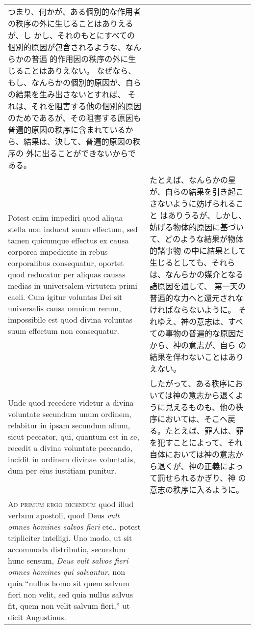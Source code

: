 \documentclass[10pt]{jsarticle} %
\begin{document}
\begin{longtable}{p{21em}p{21em}}
つまり、何かが、ある個別的な作用者の秩序の外に生じることはありえるが、し
 かし、それのもとにすべての個別的原因が包含されるような、なんらかの普遍
 的作用因の秩序の外に生じることはありえない。
なぜなら、もし、なんらかの個別的原因が、自らの結果を生み出さないとすれば、
 それは、それを阻害する他の個別的原因のためであるが、その阻害する原因も
 普遍的原因の秩序に含まれているから、結果は、決して、普遍的原因の秩序の
 外に出ることができないからである。



\\


Potest enim impediri quod aliqua stella non
inducat suum effectum, sed tamen quicumque effectus ex causa corporea
impediente in rebus corporalibus consequatur, oportet quod reducatur per
aliquas causas medias in universalem virtutem primi caeli. Cum igitur
voluntas Dei sit universalis causa omnium rerum, impossibile est quod
divina voluntas suum effectum non consequatur. 


&

たとえば、なんらかの星が、自らの結果を引き起こさないように妨げられること
 はありうるが、しかし、妨げる物体的原因に基づいて、どのような結果が物体的諸事物
 の中に結果として生じるとしても、それらは、なんらかの媒介となる諸原因を通して、
 第一天の普遍的な力へと還元されなければならないように。
それゆえ、神の意志は、すべての事物の普遍的な原因だから、神の意志が、自ら
 の結果を伴わないことはありえない。


\\


Unde quod recedere
videtur a divina voluntate secundum unum ordinem, relabitur in ipsam
secundum alium, sicut peccator, qui, quantum est in se, recedit a divina
voluntate peccando, incidit in ordinem divinae voluntatis, dum per eius
iustitiam punitur.


&

したがって、ある秩序においては神の意志から退くように見えるものも、他の秩
 序においては、そこへ戻る。たとえば、罪人は、罪を犯すことによって、それ
 自体においては神の意志から退くが、神の正義によって罰せられるかぎり、神
 の意志の秩序に入るように。


\\


{\scshape Ad primum ergo dicendum} quod illud verbum
apostoli, quod Deus {\itshape vult omnes homines salvos fieri} etc., potest
tripliciter intelligi. Uno modo, ut sit accommoda distributio, secundum
hunc sensum, {\itshape Deus vult salvos fieri omnes homines qui salvantur}, non
quia ``nullus homo sit quem salvum fieri non velit, sed quia nullus salvus
fit, quem non velit salvum fieri,'' ut dicit Augustinus. 








\end{longtable}
\end{document}
